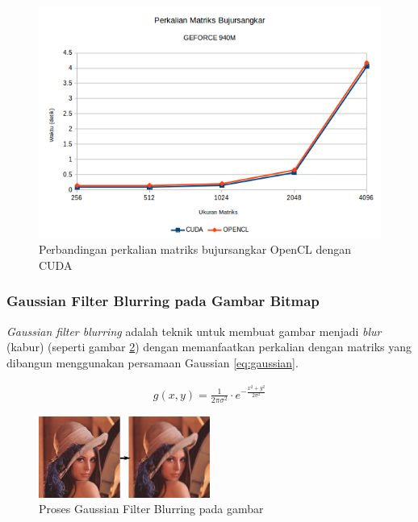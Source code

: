 \begin{figure}
	\centering
	\includegraphics[width=1.0\textwidth]
	{pics/mmul_opencl_cuda.png}
	\caption{Perbandingan perkalian matriks bujursangkar OpenCL dengan CUDA}
	\label{fig:mmul_opencl_cuda}
\end{figure}

\subsubsection{Gaussian Filter Blurring pada Gambar Bitmap}

\textit{Gaussian filter blurring} adalah teknik untuk membuat gambar menjadi \textit{blur} (kabur) (seperti gambar \ref{fig:blur_result}) dengan memanfaatkan perkalian dengan matriks yang dibangun menggunakan persamaan Gaussian \ref{eq:gaussian}.

\noindent \begin{align}\label{eq:gaussian}
g(x,y) = \frac{1}{2\pi \sigma^2} \cdot e^{-\frac{x^2 + y^2}{2 \sigma^2}}
\end{align}

\begin{figure}
	\centering
	\includegraphics[width=0.5\textwidth]
	{pics/blur_result.png}
	\caption{Proses Gaussian Filter Blurring pada gambar}
	\label{fig:blur_result}
\end{figure}

